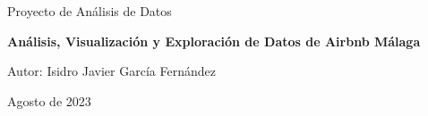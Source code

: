 \begin{titlepage}
    \centering
    \vspace*{1cm}
    
    
    
    \vspace{2cm}
    {\LARGE Proyecto de Análisis de Datos}
    
    
    \vspace{1cm}
    {\Huge\bfseries Análisis, Visualización y Exploración de Datos de Airbnb Málaga}
    
    \vspace{2cm}
    {\Large Autor: Isidro Javier García Fernández} 
    
    
    \vspace{2cm}
    {Agosto de 2023}
    \vfill
    
\end{titlepage}
\newpage
\tableofcontents
\newpage
\listoftables
\listoffigures